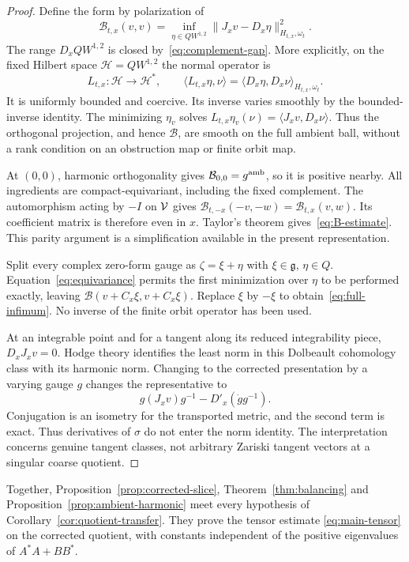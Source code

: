 \begin{proof}
Define the form by polarization of
\begin{equation}\label{eq:B-definition}
\mathcal B_{t,x}(v,v)
=\inf_{\eta\in QW^{1,2}}\|J_xv-D_x\eta\|_{H_{t,x},\omega_t}^2.
\end{equation}
The range $D_xQW^{1,2}$ is closed by~\eqref{eq:complement-gap}.
More explicitly, on the fixed Hilbert space $\mathcal H=QW^{1,2}$
the normal operator is
\[
L_{t,x}:\mathcal H\to\mathcal H^*,\qquad
\langle L_{t,x}\eta,\nu\rangle
=\langle D_x\eta,D_x\nu\rangle_{H_{t,x},\omega_t}.
\]
It is uniformly bounded and coercive. Its inverse varies smoothly
by the bounded-inverse identity. The minimizing $\eta_v$ solves
$L_{t,x}\eta_v(\nu)=\langle J_xv,D_x\nu\rangle$.
Thus the orthogonal projection, and hence $\mathcal B$, are smooth
on the full ambient ball, without a rank condition on an obstruction
map or finite orbit map.

At $(0,0)$, harmonic orthogonality gives
$\mathcal B_{0,0}=g^{\rm amb}$, so it is positive nearby.
All ingredients are compact-equivariant, including the fixed complement.
The automorphism acting by $-I$ on $\mathcal V$ gives
$\mathcal B_{t,-x}(-v,-w)=\mathcal B_{t,x}(v,w)$.
Its coefficient matrix is therefore even in $x$. Taylor's theorem
gives~\eqref{eq:B-estimate}. This parity argument is a simplification
available in the present representation.

Split every complex zero-form gauge as $\zeta=\xi+\eta$ with
$\xi\in\mathfrak g$, $\eta\in Q$. Equation~\eqref{eq:equivariance}
permits the first minimization over $\eta$ to be performed exactly,
leaving $\mathcal B(v+C_x\xi,v+C_x\xi)$. Replace $\xi$ by $-\xi$
to obtain~\eqref{eq:full-infimum}. No inverse of the finite orbit
operator has been used.

At an integrable point and for a tangent along its reduced integrability
piece, $D_xJ_xv=0$. Hodge theory identifies the least norm in this
Dolbeault cohomology class with its harmonic norm. Changing to the
corrected presentation by a varying gauge $g$ changes the representative
to
\[
g(J_xv)g^{-1}-D'_x(\dot g g^{-1}).
\]
Conjugation is an isometry for the transported metric, and the second
term is exact. Thus derivatives of $\sigma$ do not enter the norm
identity. The interpretation concerns genuine tangent classes, not
arbitrary Zariski tangent vectors at a singular coarse quotient.
\end{proof}

Together, Proposition~\ref{prop:corrected-slice},
Theorem~\ref{thm:balancing} and
Proposition~\ref{prop:ambient-harmonic} meet every hypothesis of
Corollary~\ref{cor:quotient-transfer}. They prove the tensor estimate
\eqref{eq:main-tensor} on the corrected quotient, with constants
independent of the positive eigenvalues of $A^*A+BB^*$.


